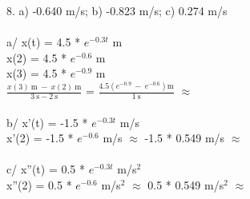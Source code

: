 \documentclass[12pt]{article}
\begin{document}
8. a) -0.640 \unit{\meter}/\unit{\second}; b) -0.823 \unit{\meter}/\unit{\second}; c) 0.274 \unit{\meter}/\unit{\second} 
\\ \\
a/ x(t) = 4.5 * $e^{-0.3t}$ \unit{\meter} \\
x(2) = 4.5 * $e^{-0.6}$ \unit{\meter} \\
x(3) = 4.5 * $e^{-0.9}$ \unit{\meter} \\
$\frac{x(3)\ \unit{\meter}\ -\ x(2)\ \unit{\meter}}{3\ \unit{\second} - 2\ \unit{\second}}$ = $\frac{4.5(e^{-0.9}\ -\ e^{-0.6}) \unit{\meter}}{1\ \unit{\second}}$ $\approx$  \\ \\
b/ x'(t) = -1.5 * $e^{-0.3t}$ \unit{\meter}/\unit{\second} \\
x'(2) = -1.5 * $e^{-0.6}$ \unit{\meter}/\unit{\second} $\approx$ -1.5 * 0.549 \unit{\meter}/\unit{\second} $\approx$ \\ \\
c/ x''(t) = 0.5 * $e^{-0.3t}$ \unit{\meter}/\unit{\second}$^2$ \\
x''(2) = 0.5 * $e^{-0.6}$ \unit{\meter}/\unit{\second}$^2$ $\approx$ 0.5 * 0.549 \unit{\meter}/\unit{\second}$^2$ $\approx$ \\ \\
\end{document}
